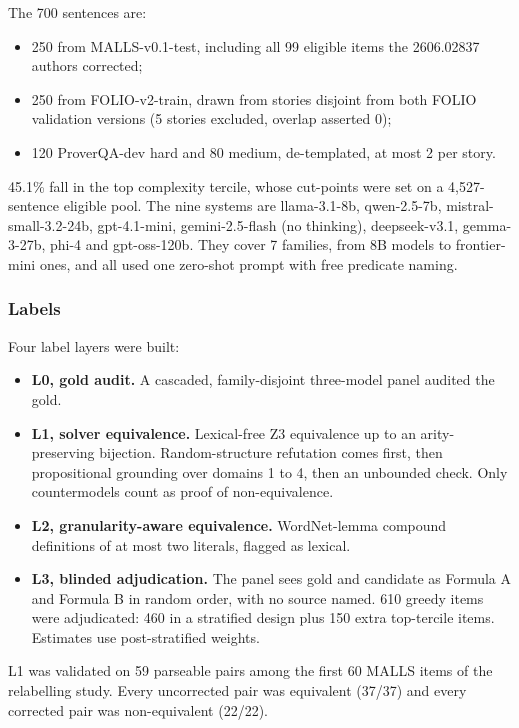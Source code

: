 \documentclass[11pt,letterpaper]{article}
\begin{document}
The 700 sentences are:

\begin{itemize}
\item {}250 from MALLS-v0.1-test, including all 99 eligible items the 2606.02837 authors corrected;
\item {}250 from FOLIO-v2-train, drawn from stories disjoint from both FOLIO validation versions (5 stories excluded, overlap asserted 0);
\item {}120 ProverQA-dev hard and 80 medium, de-templated, at most 2 per story.
\end{itemize}
45.1\% fall in the top complexity tercile, whose cut-points were set on a 4,527-sentence eligible pool. The nine systems are llama-3.1-8b, qwen-2.5-7b, mistral-small-3.2-24b, gpt-4.1-mini, gemini-2.5-flash (no thinking), deepseek-v3.1, gemma-3-27b, phi-4 and gpt-oss-120b. They cover 7 families, from 8B models to frontier-mini ones, and all used one zero-shot prompt with free predicate naming.

\subsubsection{Labels}

Four label layers were built:

\begin{itemize}
\item {}\textbf{L0, gold audit.} A cascaded, family-disjoint three-model panel audited the gold.
\item {}\textbf{L1, solver equivalence.} Lexical-free Z3 equivalence up to an arity-preserving bijection. Random-structure refutation comes first, then propositional grounding over domains 1 to 4, then an unbounded check. Only countermodels count as proof of non-equivalence.
\item {}\textbf{L2, granularity-aware equivalence.} WordNet-lemma compound definitions of at most two literals, flagged as lexical.
\item {}\textbf{L3, blinded adjudication.} The panel sees gold and candidate as Formula A and Formula B in random order, with no source named. 610 greedy items were adjudicated: 460 in a stratified design plus 150 extra top-tercile items. Estimates use post-stratified weights.
\end{itemize}
L1 was validated on 59 parseable pairs among the first 60 MALLS items of the relabelling study. Every uncorrected pair was equivalent (37/37) and every corrected pair was non-equivalent (22/22).
\end{document}
